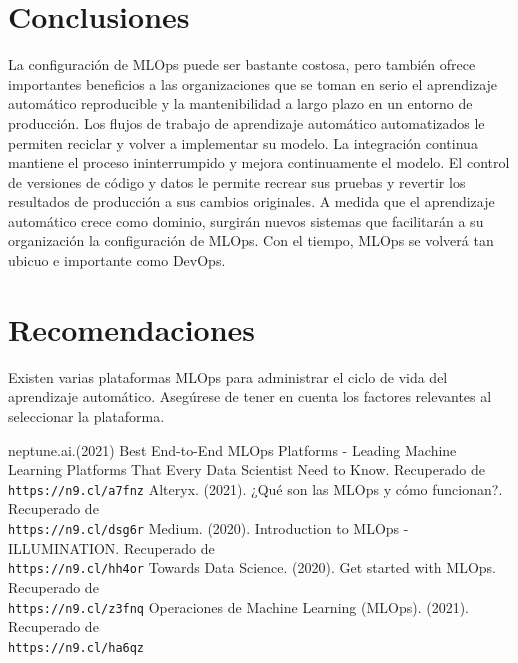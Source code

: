 \documentclass[twoside,twocolumn]{article}
\begin{document}
\section{Conclusiones}
\noindent La configuración de MLOps puede ser bastante costosa, pero también ofrece importantes beneficios a las organizaciones que se toman en serio el aprendizaje automático reproducible y la mantenibilidad a largo plazo en un entorno de producción. Los flujos de trabajo de aprendizaje automático automatizados le permiten reciclar y volver a implementar su modelo. La integración continua mantiene el proceso ininterrumpido y mejora continuamente el modelo. El control de versiones de código y datos le permite recrear sus pruebas y revertir los resultados de producción a sus cambios originales. 
A medida que el aprendizaje automático crece como dominio, surgirán nuevos sistemas que facilitarán a su organización la configuración de MLOps. Con el tiempo, MLOps se volverá tan ubicuo e importante como DevOps.


\section{Recomendaciones}
\noindent 
Existen varias plataformas MLOps para administrar el ciclo de vida del aprendizaje automático. Asegúrese de tener en cuenta los factores relevantes al seleccionar la plataforma.


\begin{thebibliography}{99} 
    \bibitem{}
    neptune.ai.(2021) Best End-to-End MLOps Platforms - Leading Machine Learning Platforms That Every Data Scientist Need to Know. Recuperado de 
    \\\texttt{https://n9.cl/a7fnz}
    \bibitem{}
    Alteryx. (2021). ¿Qué son las MLOps y cómo funcionan?. Recuperado de 
    \\\texttt{https://n9.cl/dsg6r}
    \bibitem{}
    Medium. (2020). Introduction to MLOps - ILLUMINATION. Recuperado de 
    \\\texttt{https://n9.cl/hh4or}
    \bibitem{}
    Towards Data Science. (2020). Get started with MLOps. Recuperado de 
    \\\texttt{https://n9.cl/z3fnq}
    \bibitem{}
    Operaciones de Machine Learning (MLOps). (2021).  Recuperado de 
    \\\texttt{https://n9.cl/ha6qz}
\end{thebibliography}
\end{document}
